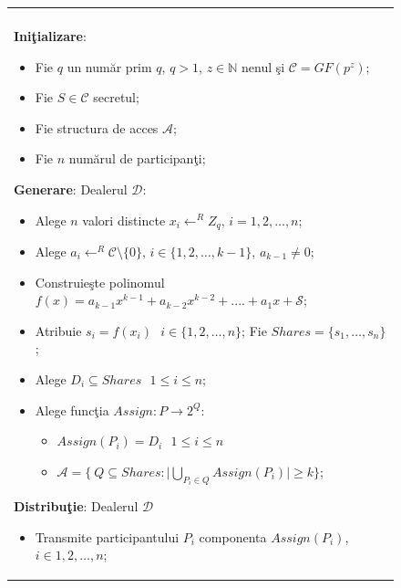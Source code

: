 \documentclass{llncs}
\begin{document}
\begin{figure}[h!]

\begin{tabular}{|p{\textwidth}|}
\hline

\\
\hspace{.1in}
\textbf{Ini\c{t}ializare}: 
	\begin{itemize}
		\item Fie $q$ un num\u{a}r prim $q$, $q > 1$, $z \in \mathbb{N}$ nenul \c{s}i $\mathcal{C} = GF(p^z)$;
		\item Fie $S \in \mathcal{C}$ secretul; 
		\item Fie structura de acces $\mathcal{A}$;
		\item Fie $n$ num\u{a}rul de participan\c{t}i;
	\end{itemize}

\medskip

\hspace{.1in}
\textbf{Generare}: Dealerul $\mathcal{D}$:
	\begin{itemize}
		\setlength{\itemsep}{5pt}
		\item Alege $n$ valori distincte $x_i \leftarrow^R Z_q \text{, }i = 1,2,\dots,n$;
		\item Alege $a_{i} \leftarrow^R \mathcal{C} \setminus \{0\} \text{, }i \in \{1,2,\dots,{k - 1}\}$, $a_{k-1} \neq 0$;
		\item Construie\c{s}te polinomul $f(x) = a_{k - 1}x ^ {k-1} + a_{k-2}x ^ {k - 2} + .... + a_1x + \mathcal{S}$;
		\item Atribuie $s_i = f(x_i) \text{ } i \in \{1,2,\dots,n\}$; Fie $Shares = \{ s_1, \dots, s_n \}$;
		\item Alege $D_i \subseteq Shares \text{ } 1 \leq i \leq n$;
		\item Alege func\c{t}ia $Assign: P \rightarrow 2^Q$:
			\begin{itemize}
				\item $Assign(P_i) = D_i \text{ } 1 \leq i \leq n$
				\item $\mathcal{A} = \bigg \{ \ Q \subseteq Shares: \bigg| \underset{P_i \in Q}{{\bigcup}} Assign(P_i) \bigg| \geq k \bigg \}$;
			\end{itemize}
	\end{itemize}
\medskip

\hspace{.1in}
\textbf{Distribu\c{t}ie}: Dealerul $\mathcal{D}$
	\begin{itemize}
		\item Transmite participantului $P_i$ componenta $Assign(P_i)$, $i \in 1,2,\dots,n$;
	\end{itemize}


\end{tabular}
\end{figure}
\end{document}
